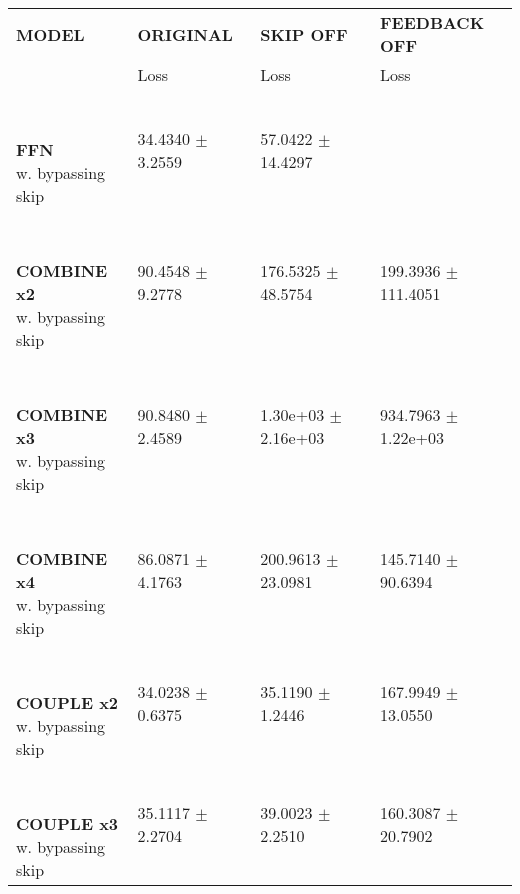 
\begin{table}[ht]
    \centering
    \begin{tabular}{|>{\columncolor{gray!05}}l|l|l|l|}
        \hline
        \rowcolor{white}
        \textbf{\footnotesize MODEL} & \textbf{\footnotesize ORIGINAL} & \textbf{\footnotesize SKIP OFF} & \textbf{\footnotesize FEEDBACK OFF} \\

        \rowcolor{white}
        & {\footnotesize Loss} & {\footnotesize Loss} & {\footnotesize Loss} \\
        \hline
\shortstack[l]{\\ {} \\ \textbf{\footnotesize FFN}\\{\footnotesize w. bypassing skip}} & {\footnotesize 34.4340 $\pm$ 3.2559} & {\footnotesize 57.0422 $\pm$ 14.4297} &  \\
 \hline 
\shortstack[l]{\\ {} \\ \textbf{\footnotesize COMBINE x2}\\{\footnotesize w. bypassing skip}} & {\footnotesize 90.4548 $\pm$ 9.2778} & {\footnotesize 176.5325 $\pm$ 48.5754} & {\footnotesize 199.3936 $\pm$ 111.4051} \\
 \hline 
\shortstack[l]{\\ {} \\ \textbf{\footnotesize COMBINE x3}\\{\footnotesize w. bypassing skip}} & {\footnotesize 90.8480 $\pm$ 2.4589} & {\footnotesize 1.30e+03 $\pm$ 2.16e+03} & {\footnotesize 934.7963 $\pm$ 1.22e+03} \\
 \hline 
\shortstack[l]{\\ {} \\ \textbf{\footnotesize COMBINE x4}\\{\footnotesize w. bypassing skip}} & {\footnotesize 86.0871 $\pm$ 4.1763} & {\footnotesize 200.9613 $\pm$ 23.0981} & {\footnotesize 145.7140 $\pm$ 90.6394} \\
 \hline 
\shortstack[l]{\\ {} \\ \textbf{\footnotesize COUPLE x2}\\{\footnotesize w. bypassing skip}} & {\footnotesize 34.0238 $\pm$ 0.6375} & {\footnotesize 35.1190 $\pm$ 1.2446} & {\footnotesize 167.9949 $\pm$ 13.0550} \\
 \hline 
\shortstack[l]{\\ {} \\ \textbf{\footnotesize COUPLE x3}\\{\footnotesize w. bypassing skip}} & {\footnotesize 35.1117 $\pm$ 2.2704} & {\footnotesize 39.0023 $\pm$ 2.2510} & {\footnotesize 160.3087 $\pm$ 20.7902} \\

\end{tabular}
\end{table}
